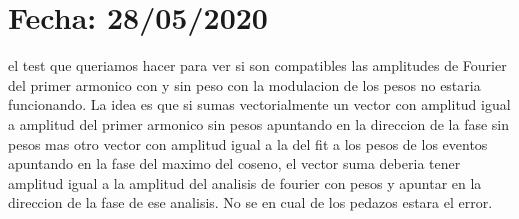  \section{Fecha: 28/05/2020}


	el test que queriamos hacer para ver si son compatibles las amplitudes de Fourier del primer armonico con y sin peso con la modulacion de los pesos no estaria funcionando. La idea es que si sumas vectorialmente un vector con amplitud igual a amplitud del primer armonico sin pesos apuntando en la direccion de la fase sin pesos mas otro vector con amplitud igual a la del fit a los pesos de los eventos apuntando en la fase del maximo del coseno, el vector suma deberia tener amplitud igual a la amplitud del analisis de fourier con pesos y apuntar en la direccion de la fase de ese analisis. No se en cual de los pedazos estara el error.
	

	
		
		

	
